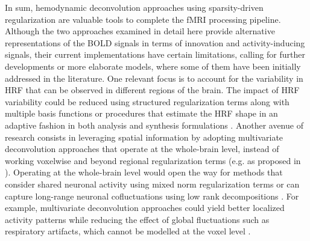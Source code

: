 In sum, hemodynamic deconvolution approaches using sparsity-driven
regularization are valuable tools to complete the fMRI processing pipeline.
Although the two approaches examined in detail here provide alternative
representations of the BOLD signals in terms of innovation and activity-inducing
signals, their current implementations have certain limitations, calling for
further developments or more elaborate models, where some of them have been
initially addressed in the literature. One relevant focus is to account for the
variability in HRF that can be observed in different regions of the brain. The
impact of HRF variability could be reduced using structured regularization terms
along with multiple basis functions
\citep{Gaudes2012Structuredsparsedeconvolution} or procedures that estimate
the HRF shape in an adaptive fashion in both analysis
\citep{Farouj2019BoldSignalDeconvolution} and synthesis formulations
\citep{cherkaoui:hal-03005584}. Another avenue of research consists in
leveraging spatial information by adopting multivariate deconvolution approaches
that operate at the whole-brain level, instead of working voxelwise and beyond
regional regularization terms (e.g. as proposed in
\citealt{Karahanoglu2013TotalactivationfMRI}).  Operating at the whole-brain
level would open the way for methods that consider shared neuronal activity
using mixed norm regularization terms \citep{urunuela-tremino_2019} or can
capture long-range neuronal cofluctuations using low rank decompositions
\citep{cherkaoui:hal-03005584}. For example, multivariate deconvolution
approaches could yield better localized activity patterns while reducing the
effect of global fluctuations such as respiratory artifacts, which cannot be
modelled at the voxel level \citealt{Urunuela_2021}. 

